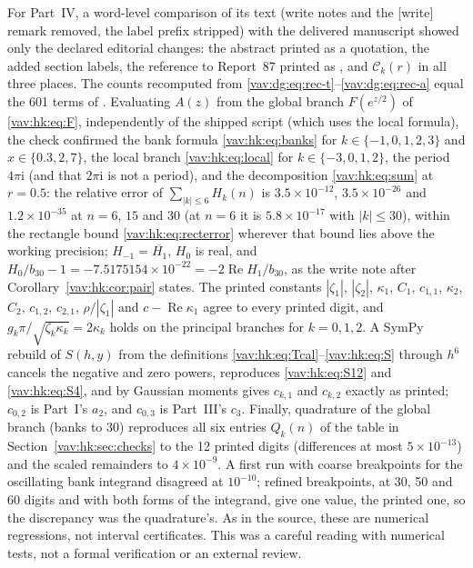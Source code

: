 \documentclass[11pt]{article}
\theoremstyle{remark}\newtheorem{remark}[theorem]{Remark}
\newcommand{\ii}{\mathrm i}
\newcommand{\Rea}{\operatorname{Re}}
\begin{document}
For Part~IV, a word-level comparison of its text (write notes and the
[write] remark removed, the label prefix stripped) with the delivered
manuscript showed only the declared editorial changes: the abstract printed
as a quotation, the added section labels, the reference to Report~87
printed as \cite{hkprior}, and $\mathcal C_k(r)$ in all three places. The counts
recomputed from \eqref{vav:dg:eq:rec-t}--\eqref{vav:dg:eq:rec-a} equal the
601 terms of . Evaluating $A(z)$
from the global branch $F(e^{z/2})$ of \eqref{vav:hk:eq:F}, independently
of the shipped script (which uses the local formula), the check confirmed
the bank formula \eqref{vav:hk:eq:banks} for $k\in\{-1,0,1,2,3\}$ and
$x\in\{0.3,2,7\}$, the local branch \eqref{vav:hk:eq:local} for
$k\in\{-3,0,1,2\}$, the period $4\pi\ii$ (and that $2\pi\ii$ is not a
period), and the decomposition \eqref{vav:hk:eq:sum} at $r=0.5$: the
relative error of $\sum_{|k|\le6}H_k(n)$ is $3.5\times10^{-12}$,
$3.5\times10^{-26}$ and $1.2\times10^{-35}$ at $n=6$, $15$ and $30$ (at
$n=6$ it is $5.8\times10^{-17}$ with $|k|\le30$), within the rectangle bound
\eqref{vav:hk:eq:recterror} wherever that bound lies above the working
precision; $H_{-1}=\overline{H_1}$, $H_0$ is real, and
$H_0/b_{30}-1=-7.5175154\times10^{-22}=-2\Rea H_1/b_{30}$, as the write note
after Corollary~\ref{vav:hk:cor:pair} states. The printed constants
$|\zeta_1|$, $|\zeta_2|$, $\kappa_1$, $C_1$, $c_{1,1}$, $\kappa_2$, $C_2$,
$c_{1,2}$, $c_{2,1}$, $\rho/|\zeta_1|$ and $c-\Rea\kappa_1$ agree to every
printed digit, and $g_k\pi/\sqrt{\zeta_k\kappa_k}=2\kappa_k$ holds on the
principal branches for $k=0,1,2$. A SymPy rebuild of $S(h,y)$ from the definitions
\eqref{vav:hk:eq:Tcal}--\eqref{vav:hk:eq:S} through $h^6$ cancels the
negative and zero powers, reproduces \eqref{vav:hk:eq:S12} and
\eqref{vav:hk:eq:S4}, and by Gaussian moments gives $c_{k,1}$ and $c_{k,2}$
exactly as printed; $c_{0,2}$ is Part~I's $a_2$, and $c_{0,3}$ is Part~III's
$c_3$. Finally, quadrature of the global branch (banks to $30$) reproduces
all six entries $Q_k(n)$ of the table in Section~\ref{vav:hk:sec:checks} to
the 12 printed digits (differences at most $5\times10^{-13}$) and the
scaled remainders to $4\times10^{-9}$. A first run with coarse breakpoints
for the oscillating bank integrand disagreed at $10^{-10}$; refined
breakpoints, at 30, 50 and 60 digits and with both forms of the integrand,
give one value, the printed one, so the discrepancy was the quadrature's.
As in the source, these are numerical regressions, not interval
certificates. This was a careful reading with numerical tests, not a
formal verification or an external review.
\end{document}
